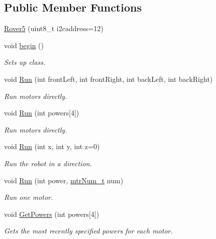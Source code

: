 \subsection*{Public Member Functions}
\begin{DoxyCompactItemize}
\item 
\hyperlink{classRover5_aa8e420b415903841a5b72aebf40510e5}{Rover5} (uint8\-\_\-t i2caddress=12)
\item 
void \hyperlink{classRover5_a40a0c9f2780d03ba80430d9f85c5a82d}{begin} ()
\begin{DoxyCompactList}\small\item\em Sets up class. \end{DoxyCompactList}\item 
void \hyperlink{classRover5_aa1c9cc5c0baf2e6ec1bc17f4b5532085}{Run} (int front\-Left, int front\-Right, int back\-Left, int back\-Right)
\begin{DoxyCompactList}\small\item\em Run motors directly. \end{DoxyCompactList}\item 
void \hyperlink{classRover5_a40ef70c4d62031f1cdba8e7b6f000e81}{Run} (int powers\mbox{[}4\mbox{]})
\begin{DoxyCompactList}\small\item\em Run motors directly. \end{DoxyCompactList}\item 
void \hyperlink{classRover5_a531c2e92edc8f2d45ba7f7b497b61cf9}{Run} (int x, int y, int z=0)
\begin{DoxyCompactList}\small\item\em Run the robot in a direction. \end{DoxyCompactList}\item 
void \hyperlink{classRover5_acdcc24c043ad622563c80a836f211903}{Run} (int power, \hyperlink{classRover5_a7ab37bde98ed7f9626e8489e754b0afe}{mtr\-Num\-\_\-t} num)
\begin{DoxyCompactList}\small\item\em Run one motor. \end{DoxyCompactList}\item 
void \hyperlink{classRover5_a46a5f2eaa4fa4686fb262e688a8b0131}{Get\-Powers} (int powers\mbox{[}4\mbox{]})
\begin{DoxyCompactList}\small\item\em Gets the most recently specified powers for each motor. \end{DoxyCompactList}\item 

\end{DoxyCompactItemize}
